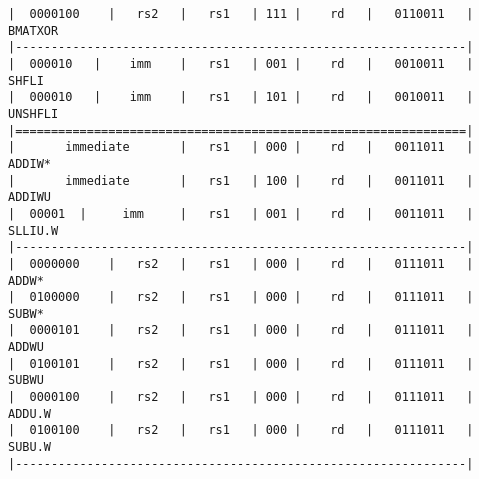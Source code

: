 \begin{minipage}{\linewidth}
\begin{verbatim}
|  0000100    |   rs2   |   rs1   | 111 |    rd   |   0110011   |  BMATXOR
|---------------------------------------------------------------|
|  000010   |    imm    |   rs1   | 001 |    rd   |   0010011   |  SHFLI
|  000010   |    imm    |   rs1   | 101 |    rd   |   0010011   |  UNSHFLI
|===============================================================|
|       immediate       |   rs1   | 000 |    rd   |   0011011   |  ADDIW*
|       immediate       |   rs1   | 100 |    rd   |   0011011   |  ADDIWU
|  00001  |     imm     |   rs1   | 001 |    rd   |   0011011   |  SLLIU.W
|---------------------------------------------------------------|
|  0000000    |   rs2   |   rs1   | 000 |    rd   |   0111011   |  ADDW*
|  0100000    |   rs2   |   rs1   | 000 |    rd   |   0111011   |  SUBW*
|  0000101    |   rs2   |   rs1   | 000 |    rd   |   0111011   |  ADDWU
|  0100101    |   rs2   |   rs1   | 000 |    rd   |   0111011   |  SUBWU
|  0000100    |   rs2   |   rs1   | 000 |    rd   |   0111011   |  ADDU.W
|  0100100    |   rs2   |   rs1   | 000 |    rd   |   0111011   |  SUBU.W
|---------------------------------------------------------------|
\end{verbatim}
\end{minipage}

